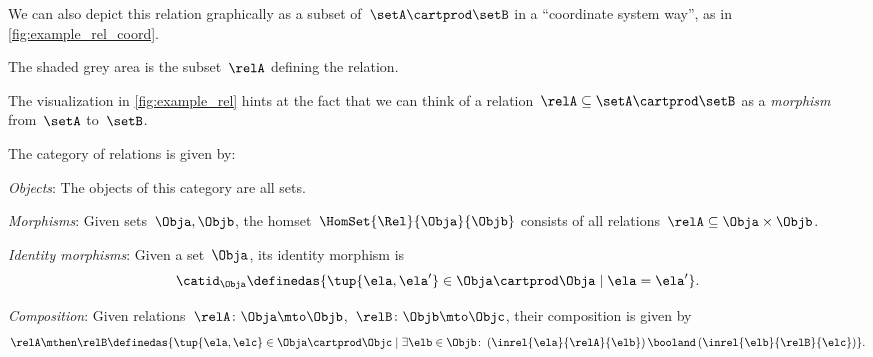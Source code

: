 We can also depict this relation graphically as a subset of~$\setA \cartprod \setB$ in a ``coordinate system way'', as in \cref{fig:example_rel_coord}.

The shaded grey area is the subset~$\relA$ defining the relation.


The visualization in \cref{fig:example_rel} hints at the fact that we can think of a relation~$\relA \subseteq \setA \cartprod \setB$ as a \emph{morphism} from~$\setA$ to~$\setB$.


\begin{ctdefinition}
    \label{def:Rel}
    The category of relations \iindex{\Rel}  is given by:
    \begin{compactenum}
        \item \emph{Objects}: The objects of this category are all sets.
        \item \emph{Morphisms}: Given sets~$\Obja, \Objb$, the homset~$\HomSet{\Rel}{\Obja}{\Objb}$ consists of all relations~$\relA\subseteq \Obja\times \Objb$.
        \item \emph{Identity morphisms}: Given a set~$\Obja$, its identity morphism is
        \begin{equation}
            \catid_\Obja \definedas \{ \tup{\ela,\ela'} \in \Obja \cartprod \Obja \mid  \ela = \ela' \}.
        \end{equation}
        \item \emph{Composition}: Given relations~$\relA \colon \Obja\mto \Objb$,~$\relB \colon \Objb\mto \Objc$, their composition is given by
        \begin{equation}
            \label{eq:RelCompRule}
            \relA \mthen \relB \definedas \{\tup{\ela,\elc} \in \Obja \cartprod \Objc \mid  \exists \elb \in \Objb \colon \left(\inrel{\ela}{\relA}{\elb} \right) \booland \left(\inrel{\elb}{\relB}{\elc}\right)\}.
        \end{equation}
    \end{compactenum}
\end{ctdefinition}

